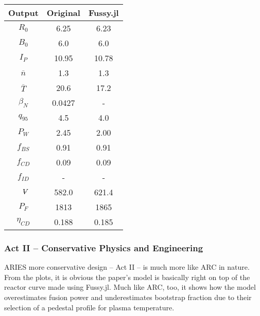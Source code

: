 \begin{table}[h!]
\begin{subtable}[t]{0.5\textwidth}
\begin{tabular}{ c|c|c }
Output           & Original         & Fussy.jl        \\
\hline
$R_{0}$          & 6.25             & 6.23           \\
$B_{0}$          & 6.0              & 6.0           \\
$I_{P}$          & 10.95            & 10.78           \\
$\overline n$    & 1.3              & 1.3           \\
$\overline T$    & 20.6             & 17.2            \\
$\beta_{N}$       & 0.0427           & -          \\
$q_{95}$         & 4.5              & 4.0           \\
$P_{W}$          & 2.45             & 2.00           \\
$f_{BS}$         & 0.91             & 0.91           \\
$f_{CD}$         & 0.09             & 0.09           \\
$f_{ID}$         & -              & -             \\
$\volume$         & 582.0            & 621.4           \\
$P_{F}$          & 1813           & 1865          \\
$\eta_{CD}$      & 0.188            & 0.185          \\

\end{tabular}
\end{subtable}
\hfill
\hfill
\end{table}

\newpage 

\subsubsection{Act II -- Conservative Physics and Engineering}

ARIES more conservative design -- Act II -- is much more like ARC in nature. From the plots, it is obvious the paper's model is basically right on top of the reactor curve made using Fussy.jl.  Much like ARC, too, it shows how the model overestimates fusion power and underestimates bootstrap fraction due to their selection of a pedestal profile for plasma temperature.

